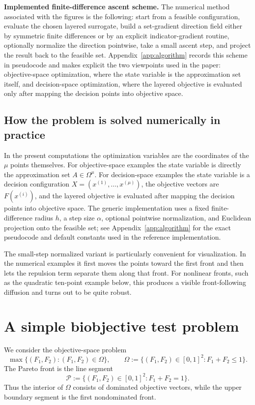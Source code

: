 \documentclass{article}
\begin{document}
\medskip
\noindent\textbf{Implemented finite-difference ascent scheme.}
The numerical method associated with the figures is the following: start from a feasible configuration, evaluate the chosen layered surrogate, build a set-gradient direction field either by symmetric finite differences or by an explicit indicator-gradient routine, optionally normalize the direction pointwise, take a small ascent step, and project the result back to the feasible set. Appendix~\ref{app:algorithm} records this scheme in pseudocode and makes explicit the two viewpoints used in the paper: objective-space optimization, where the state variable is the approximation set itself, and decision-space optimization, where the layered objective is evaluated only after mapping the decision points into objective space.

\subsection*{How the problem is solved numerically in practice}
In the present computations the optimization variables are the coordinates of the $\mu$ points themselves. For objective-space examples the state variable is directly the approximation set $A\in\Omega^\mu$. For decision-space examples the state variable is a decision configuration $X=(x^{(1)},\dots,x^{(\mu)})$, the objective vectors are $F(x^{(i)})$, and the layered objective is evaluated after mapping the decision points into objective space. The generic implementation uses a fixed finite-difference radius $h$, a step size $\alpha$, optional pointwise normalization, and Euclidean projection onto the feasible set; see Appendix~\ref{app:algorithm} for the exact pseudocode and default constants used in the reference implementation.

The small-step normalized variant is particularly convenient for visualization. In the numerical examples it first moves the points toward the first front and then lets the repulsion term separate them along that front. For nonlinear fronts, such as the quadratic ten-point example below, this produces a visible front-following diffusion and turns out to be quite robust.

\section{A simple biobjective test problem}
We consider the objective-space problem
\[
\max \{(F_1,F_2): (F_1,F_2)\in \Omega\},
\qquad
\Omega:=\{(F_1,F_2)\in [0,1]^2: F_1+F_2\le 1\}.
\]
The Pareto front is the line segment
\[
\mathcal{P}:=\{(F_1,F_2)\in [0,1]^2: F_1+F_2=1\}.
\]
Thus the interior of $\Omega$ consists of dominated objective vectors, while the upper boundary segment is the first nondominated front.
\end{document}

